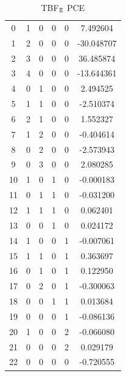 \documentclass[preprint,12pt]{elsarticle}
\begin{document}
\begin{table}
\begin{minipage}[!h]{0.25\textwidth}
{\begin{tabular}{|c|cccc|c|}
\hline
0  &   1 &   0 &   0 &   0 &   7.492604 \\
1  &   2 &   0 &   0 &   0 & -30.048707 \\
2  &   3 &   0 &   0 &   0 &  36.485874 \\
3  &   4 &   0 &   0 &   0 & -13.644361 \\
4  &   0 &   1 &   0 &   0 &   2.494525 \\
5  &   1 &   1 &   0 &   0 &  -2.510374 \\
6  &   2 &   1 &   0 &   0 &   1.552327 \\
7  &   1 &   2 &   0 &   0 &  -0.404614 \\
8  &   0 &   2 &   0 &   0 &  -2.573943 \\
9  &   0 &   3 &   0 &   0 &   2.080285 \\
10 &   1 &   0 &   1 &   0 &  -0.000183 \\
11 &   0 &   1 &   1 &   0 &  -0.031200 \\
12 &   1 &   1 &   1 &   0 &   0.062401 \\
13 &   0 &   0 &   1 &   0 &   0.024172 \\
14 &   1 &   0 &   0 &   1 &  -0.007061 \\
15 &   1 &   1 &   0 &   1 &   0.363697 \\
16 &   0 &   1 &   0 &   1 &   0.122950 \\
17 &   0 &   2 &   0 &   1 &  -0.300063 \\
18 &   0 &   0 &   1 &   1 &   0.013684 \\
19 &   0 &   0 &   0 &   1 &  -0.086136 \\
20 &   1 &   0 &   0 &   2 &  -0.066080 \\
21 &   0 &   0 &   0 &   2 &   0.029179 \\
22 &   0 &   0 &   0 &   0 &  -0.720555 \\
\hline
\end{tabular}}
\caption{TBF$_{\mathbb{E}}$ PCE}
\end{minipage}%
%
\begin{minipage}[!h]{0.25\textwidth}
\end{minipage}
\end{table}
\end{document}
